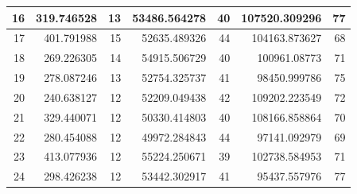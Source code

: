 \begin{table}
\begin{adjustwidth}{}{}
{{\begin{tabular}{|r|r|r|r|r|r|r|}
					\hline
					16                                         & 319.746528                   & 13                                    & 53486.564278                   & 40                                    & 107520.309296                & 77                                     \\ 
					\hline
					17                                         & 401.791988                   & 15                                    & 52635.489326                   & 44                                    & 104163.873627                & 68                                     \\ 
					\hline
					18                                         & 269.226305                   & 14                                    & 54915.506729                   & 40                                    & 100961.08773                 & 71                                     \\ 
					\hline
					19                                         & 278.087246                   & 13                                    & 52754.325737                   & 41                                    & 98450.999786                 & 75                                     \\ 
					\hline
					20                                         & 240.638127                   & 12                                    & 52209.049438                   & 42                                    & 109202.223549                & 72                                     \\ 
					\hline
					21                                         & 329.440071                   & 12                                    & 50330.414803                   & 40                                    & 108166.858864                & 70                                     \\ 
					\hline
					22                                         & 280.454088                   & 12                                    & 49972.284843                   & 44                                    & 97141.092979                 & 69                                     \\ 
					\hline
					23                                         & 413.077936                   & 12                                    & 55224.250671                   & 39                                    & 102738.584953                & 71                                     \\ 
					\hline
					24                                         & 298.426238                   & 12                                    & 53442.302917                   & 41                                    & 95437.557976                 & 77                                     \\ 

\end{tabular}}}
\end{adjustwidth}
\end{table}

